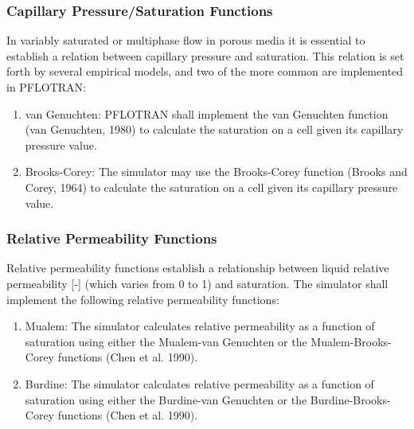 \subsubsection{Capillary Pressure/Saturation Functions}
In variably saturated or multiphase flow in porous media it is essential to establish a relation between capillary pressure and saturation. This relation is set forth by several empirical models, and two of the more common are implemented in PFLOTRAN:
\begin{enumerate}[label=CR \arabic*.,ref=CR \arabic*,nosep, resume]
	\item van Genuchten: \label{vanGen} PFLOTRAN shall implement the van Genuchten function (van Genuchten, 1980) to calculate the saturation on a cell given its capillary pressure value.
	\item Brooks-Corey: \label{brCorey} The simulator may use the Brooks-Corey function (Brooks and Corey,  1964) to calculate the saturation on a cell given its capillary pressure value.
\end{enumerate}

\subsubsection{Relative Permeability Functions}

Relative permeability functions establish a relationship between liquid relative permeability [-] (which varies from 0 to 1) and saturation. The simulator shall implement the following relative permeability functions: 

\begin{enumerate}[label=CR \arabic*.,ref=CR \arabic*,nosep, resume]
	\item Mualem: \label{mualem} The simulator calculates relative permeability as a function of saturation using either the Mualem-van Genuchten or the Mualem-Brooks-Corey functions (Chen et al. 1990). 
	\item Burdine: \label{burdine} The simulator calculates relative permeability as a function of saturation using either the Burdine-van Genuchten or the Burdine-Brooks-Corey functions (Chen et al. 1990). 
\end{enumerate}

